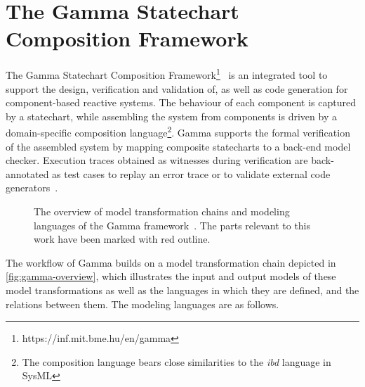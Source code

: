 \section{The Gamma Statechart Composition Framework}\label{sec:gamma}

The Gamma Statechart Composition Framework\footnote{https://inf.mit.bme.hu/en/gamma}~\cite{mixed_statecharts_2020} is an integrated tool to support the design, verification and validation of, as well as code generation for component-based reactive systems. The behaviour of each component is captured by a statechart, while assembling the system from components is driven by a domain-specific composition language\footnote{The composition language bears close similarities to the \emph{ibd} language in SysML}. Gamma supports the formal verification of the assembled system by mapping composite statecharts to a back-end model checker. Execution traces obtained as witnesses during verification are back-annotated as test cases to replay an error trace or to validate external code generators~\cite{molnar2018gamma}. 

\begin{figure}[!ht]
	\centering
	
	\caption{The overview of model transformation chains and modeling languages of the Gamma framework~\cite{mixed_statecharts_2020}. The parts relevant to this work have been marked with red outline.}
	\label{fig:gamma-overview}
\end{figure}

The workflow of Gamma builds on a model transformation chain depicted in \autoref{fig:gamma-overview}, which illustrates the input and output models of these model transformations as well as the languages in which they are defined, and the relations between them. The modeling languages are as follows.


